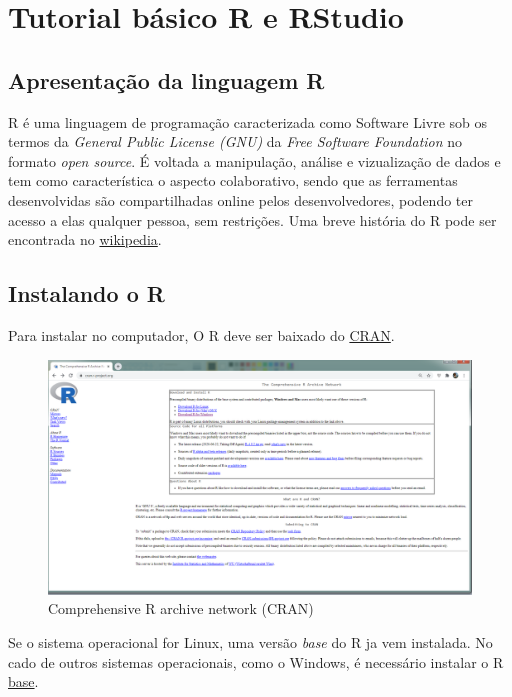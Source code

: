 \documentclass[
]{book}
\begin{document}
\hypertarget{tuto}{%
\chapter{Tutorial básico R e RStudio}\label{tuto}}

\hypertarget{apresentauxe7uxe3o-da-linguagem-r}{%
\section{Apresentação da linguagem R}\label{apresentauxe7uxe3o-da-linguagem-r}}

R é uma linguagem de programação caracterizada como Software Livre sob os termos da \emph{General Public License (GNU)} da \emph{Free Software Foundation} no formato \emph{open source}. É voltada a manipulação, análise e vizualização de dados e tem como característica o aspecto colaborativo, sendo que as ferramentas desenvolvidas são compartilhadas online pelos desenvolvedores, podendo ter acesso a elas qualquer pessoa, sem restrições. Uma breve história do R pode ser encontrada no \href{https://pt.wikipedia.org/wiki/R_(linguagem_de_programa\%C3\%A7\%C3\%A3o)}{wikipedia}.

\hypertarget{instalando-o-r}{%
\section{Instalando o R}\label{instalando-o-r}}

Para instalar no computador, O R deve ser baixado do \href{https://cran.r-project.org/}{CRAN}.

\begin{figure}
\includegraphics[width=0.9\linewidth]{Figuras/CRAN} \caption{Comprehensive R archive network (CRAN)}\label{fig:cran}
\end{figure}

Se o sistema operacional for Linux, uma versão \emph{base} do R ja vem instalada. No cado de outros sistemas operacionais, como o Windows, é necessário instalar o R \href{https://cran.r-project.org/bin/windows/base/}{base}.
\end{document}
